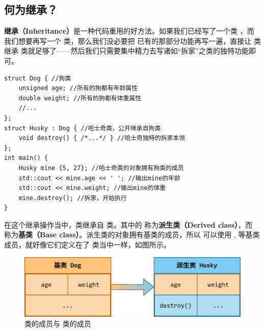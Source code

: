 \subsection*{何为继承？}
\textbf{继承（Inheritance）}是一种代码重用的好方法。如果我们已经写了一个类 \lstinline@Dog@，而我们想要再写一个 \lstinline@Husky@ 类，那么我们没必要把 \lstinline@Dog@ 已有的那部分功能再写一遍，直接让 \lstinline@Husky@ 类继承 \lstinline@Dog@ 类就足够了——然后我们只需要集中精力去写诸如``拆家''之类的独特功能即可。\par
\begin{lstlisting}
struct Dog { //狗类
    unsigned age; //所有的狗都有年龄属性
    double weight; //所有的狗都有体重属性
    //...
};
struct Husky : Dog { //哈士奇类，公开继承自狗类
    void destroy() { /*...*/ } //哈士奇独特的拆家本领
};
int main() {
    Husky mine {5, 27}; //哈士奇类的对象拥有狗类的成员
    std::cout << mine.age << ' '; //输出mine的年龄
    std::cout << mine.weight; //输出mine的体重
    mine.destroy(); //拆家，开始执行
}
\end{lstlisting}
在这个继承操作当中，\lstinline@Husky@ 类继承自 \lstinline@Dog@ 类。其中的 \lstinline@Husky@ 称为\textbf{派生类（Derived class）}，而 \lstinline@Dog@ 称为\textbf{基类（Base class）}。派生类的对象拥有基类的成员，所以 \lstinline@mine@ 可以使用 \lstinline@age@, \lstinline@weight@ 等基类成员，就好像它们定义在了 \lstinline@Husky@ 类当中一样，如图所示。
\begin{figure}[htbp]
    \centering
    \includegraphics[width=.8\textwidth]{../images/generalized_parts/09_dog_and_husky_relationship_300.png}
    \caption{\lstinline@Dog@ 类的成员与 \lstinline@Husky@ 类的成员}
\end{figure}\par
